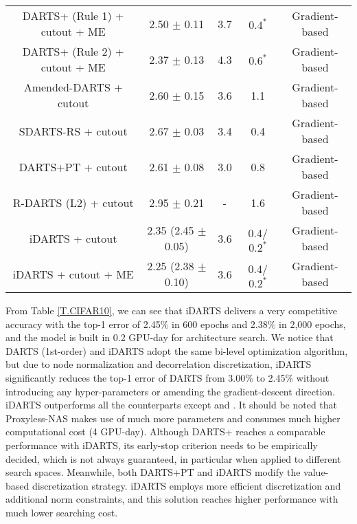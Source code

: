 \documentclass[journal]{IEEEtran}
\begin{document}
\begin{table*}[t]
\begin{center}
{\begin{tabular}{c|c|c|c|c}
DARTS+ (Rule 1) + cutout + ME \cite{DBLP:journals/corr/abs-1909-06035} & 2.50 $\pm$ 0.11 & 3.7 & $0.4^{*}$ &Gradient-based \\
DARTS+ (Rule 2) + cutout + ME \cite{DBLP:journals/corr/abs-1909-06035} & 2.37 $\pm$ 0.13 & 4.3 & $0.6^{*}$ &Gradient-based \\
Amended-DARTS + cutout \cite{DBLP:journals/corr/abs-1910-11831} & 2.60 $\pm$ 0.15 & 3.6 & 1.1 &Gradient-based \\
SDARTS-RS + cutout \cite{DBLP:conf/icml/ChenH20} & 2.67 $\pm$ 0.03 & 3.4 & 0.4 & Gradient-based \\
DARTS+PT + cutout \cite{DBLP:conf/iclr/Wang21} & 2.61 $\pm$ 0.08 & 3.0 & 0.8 & Gradient-based\\
R-DARTS (L2) + cutout \cite{DBLP:journals/corr/abs-1909-09656} & 2.95 $\pm$ 0.21 & - & 1.6 & Gradient-based\\
\hline
iDARTS + cutout & 2.35 (2.45 $\pm$ 0.05) & 3.6 & 0.4/$0.2^{*}$ & Gradient-based \\
iDARTS + cutout + ME & 2.25 (2.38 $\pm$ 0.10) & 3.6 & 0.4/$0.2^{*}$ &Gradient-based\\
\hline
\hline
\end{tabular}}
\label{T.CIFAR10}
\end{center}
\end{table*}


From Table \ref{T.CIFAR10}, we can see that iDARTS delivers a very competitive accuracy with the top-1 error of 2.45\% in 600 epochs and 2.38\% in 2,000 epochs, and the model is built in 0.2 GPU-day for architecture search. We notice that DARTS (1st-order) and iDARTS adopt the same bi-level optimization algorithm, but due to node normalization and decorrelation discretization, iDARTS significantly reduces the top-1 error of DARTS from 3.00\% to 2.45\% without introducing any hyper-parameters or amending the gradient-descent direction. iDARTS outperforms all the counterparts except \cite{DBLP:conf/iclr/CaiZH19} and \cite{DBLP:journals/corr/abs-1909-06035}. It should be noted that Proxyless-NAS \cite{DBLP:conf/iclr/CaiZH19} makes use of much more parameters and consumes much higher computational cost (4 GPU-day).  Although DARTS+ \cite{DBLP:journals/corr/abs-1909-06035} reaches a comparable performance with iDARTS, its early-stop criterion needs to be empirically decided, which is not always guaranteed, in particular when applied to different search spaces. Meanwhile, both DARTS+PT \cite{DBLP:conf/iclr/Wang21} and iDARTS modify the value-based discretization strategy. iDARTS employs more efficient discretization and additional norm constraints, and this solution reaches higher performance with much lower searching cost.
\end{document}
